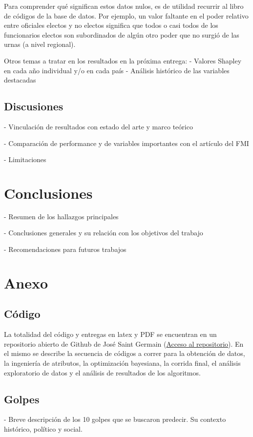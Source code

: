 \documentclass{article}
\begin{document}
Para comprender qué significan estos datos nulos, es de utilidad recurrir al libro de 
códigos de la base de datos. Por ejemplo, un valor faltante en el poder relativo entre 
oficiales electos y no electos significa que todos o casi todos de los funcionarios 
electos son subordinados de algún otro poder que no surgió de las urnas (a nivel
regional).

Otros temas a tratar en los resultados en la próxima entrega:
- Valores Shapley en cada año individual y/o en cada país
- Análisis histórico de las variables destacadas

\subsection{Discusiones}
- Vinculación de resultados con estado del arte y marco teórico

- Comparación de performance y de variables importantes con el artículo del FMI

- Limitaciones 

\section{Conclusiones}
- Resumen de los hallazgos principales

- Conclusiones generales y su relación con los objetivos del trabajo

- Recomendaciones para futuros trabajos


\section{Anexo}
\subsection{Código}
La totalidad del código y entregas en latex y PDF se encuentran en un repositorio abierto de
Github de José Saint Germain (\href{https://github.com/josesg998/esp_data_mining}{Acceso al 
repositorio}). En el mismo se describe la secuencia de códigos a correr para la obtención de 
datos, la ingeniería de atributos, la optimización bayesiana, la corrida final, el análisis 
exploratorio de datos y el análisis de resultados de los algoritmos.

\subsection{Golpes}
- Breve descripción de los 10 golpes que se buscaron predecir. Su contexto histórico, político y 
social.
\end{document}
